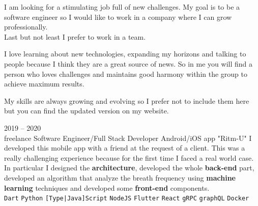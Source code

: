 \documentclass[9pt]{developercv} %
\begin{document}
\begin{minipage}[t]{0.3\textwidth}
	\vspace{-\baselineskip} %

	
	I am looking for a stimulating job full of new challenges. 
	My goal is to be a software engineer so I would like to work in a company where 
	I can grow professionally.\\
	Last but not least I prefer to work in a team.
\end{minipage}
\hfill
\begin{minipage}[t]{0.3\textwidth}
	\vspace{-\baselineskip} %
	

	I love learning about new technologies, 
	expanding my horizons and talking to people because I think they are a great source of news.
	So in me you will find a person who loves challenges and maintains good harmony within 
	the group to achieve maximum results.
\end{minipage}
\hfill
\begin{minipage}[t]{0.3\textwidth}
	\vspace{-\baselineskip} %
	
	
	My skills are always growing and evolving so I prefer not to include them here 
	but you can find the updated version on my website.
\end{minipage}



\begin{entrylist}
	\entry
		{2019 -- 2020\\\footnotesize{freelance}}
		{Software Engineer/Full Stack Developer}
		{Android/iOS app "Ritm-U"}
		{
			I developed this mobile app with a friend at the request of a client. This was a really challenging
			experience because for the first time I faced a real world case. In particular I designed the \textbf{architecture}, developed
			the whole \textbf{back-end} part, developed an algorithm that analyze the breath frequency using \textbf{machine learning} techniques 
			and developed some \textbf{front-end} components.
            \\ 
            \texttt{Dart}\slashsep
            \texttt{Python}\slashsep
            \texttt{[Type|Java]Script}\slashsep
            \texttt{NodeJS}\slashsep
            \texttt{Flutter}\slashsep
            \texttt{React}\slashsep
            \texttt{gRPC}\slashsep
            \texttt{graphQL}\slashsep
            \texttt{Docker}
        }
\end{entrylist}
\end{document}
